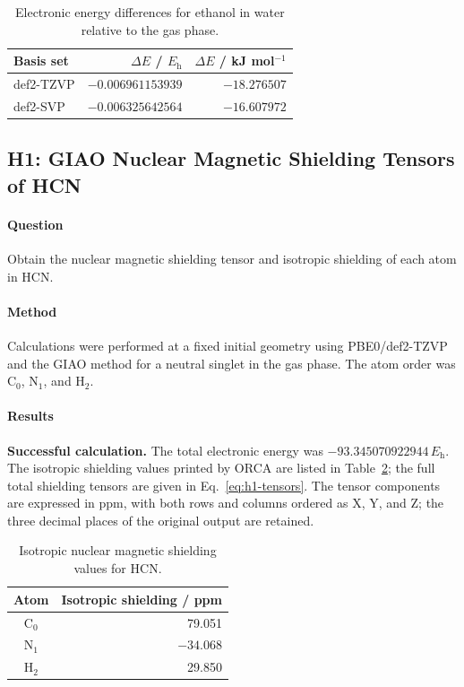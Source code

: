 \documentclass[a4paper,11pt]{article}
\newcommand{\Eh}{E_{\mathrm h}}
\begin{document}
\begin{table}[H]
  \centering\small
  \caption{Electronic energy differences for ethanol in water relative to the gas phase.}
  \label{tab:t5-differences}
  \begin{tabular}{lrr}
    \toprule
    Basis set & $\Delta E$ / $\Eh$ & $\Delta E$ / kJ mol$^{-1}$\\
    \midrule
    def2-TZVP & $-0.006961153939$ & $-18.276507$\\
    def2-SVP & $-0.006325642564$ & $-16.607972$\\
    \bottomrule
  \end{tabular}
\end{table}

\subsection{H1: GIAO Nuclear Magnetic Shielding Tensors of HCN}
\paragraph{Question}
Obtain the nuclear magnetic shielding tensor and isotropic shielding of each atom in HCN.

\paragraph{Method}
Calculations were performed at a fixed initial geometry using PBE0/def2-TZVP and the GIAO method for a neutral singlet in the gas phase.
The atom order was C$_0$, N$_1$, and H$_2$.

\paragraph{Results}
\textbf{Successful calculation.} The total electronic energy was $-93.345070922944\,\Eh$.
The isotropic shielding values printed by ORCA are listed in Table~\ref{tab:h1-isotropic}; the full total shielding tensors are given in Eq.~\eqref{eq:h1-tensors}.
The tensor components are expressed in ppm, with both rows and columns ordered as X, Y, and Z; the three decimal places of the original output are retained.

\begin{table}[H]
  \centering\small
  \caption{Isotropic nuclear magnetic shielding values for HCN.}
  \label{tab:h1-isotropic}
  \begin{tabular}{cr}
    \toprule
    Atom & Isotropic shielding / ppm\\
    \midrule
    C$_0$ & 79.051\\
    N$_1$ & $-34.068$\\
    H$_2$ & 29.850\\
    \bottomrule
  \end{tabular}
\end{table}
\end{document}
